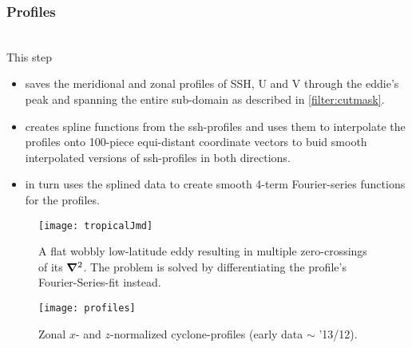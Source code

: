 \subsubsection{Profiles}\label{filter:profiles}
\\
This step
\begin{itemize}
\item
 saves the meridional and zonal profiles of SSH, U and V through  the eddie's peak and spanning the entire sub-domain as described in \ref{filter:cutmask}.
\item
creates spline functions from the ssh-profiles and uses them to interpolate the profiles onto 100-piece equi-distant coordinate vectors to buid smooth interpolated versions of ssh-profiles in both directions.
\item
in turn uses the splined data to create smooth 4-term Fourier-series functions for the profiles.
\end{itemize}
\begin{figure}
\begin{center}
	\texttt{[image: tropicalJmd]}
	\caption{A flat wobbly low-latitude eddy resulting in multiple zero-crossings of its $\mathbf{\bm{\nabla}}^2$. The problem is solved by differentiating the profile's Fourier-Series-fit instead.}
	\label{fig:tropicalJmd}
\end{center}
\end{figure}
\begin{wrapfigure}{r}{0.4\textwidth}
	\texttt{[image: profiles]}
	\caption{Zonal $x$- and $z$-normalized cyclone-profiles (early data $\sim$ '13/12).}
	\label{fig:profiles}
\end{wrapfigure}
